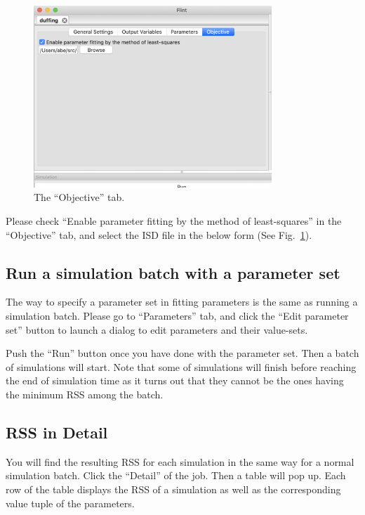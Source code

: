 \documentclass[a4paper,10pt]{report}
\begin{document}
\begin{figure}[htbp]
\centering
\includegraphics[width=0.8\textwidth]{image/parameter-fitting-objective.png}
\caption{\label{fig:orga6bd78b}The ``Objective'' tab.}
\end{figure}

Please check ``Enable parameter fitting by the method of least-squares'' in the
``Objective'' tab, and select the ISD file in the below form (See
Fig.~\ref{fig:orga6bd78b}).

\subsection{Run a simulation batch with a parameter set}
\label{sec:org11c4248}
The way to specify a parameter set in fitting parameters is the same as running
a simulation batch. Please go to ``Parameters'' tab, and click the ``Edit parameter
set'' button to launch a dialog to edit parameters and their value-sets.

Push the ``Run'' button once you have done with the parameter set. Then a batch
of simulations will start. Note that some of simulations will finish before
reaching the end of simulation time as it turns out that they cannot be the ones
having the minimum RSS among the batch.

\subsection{RSS in Detail}
\label{sec:org590ab78}
You will find the resulting RSS for each simulation in the same way for a normal
simulation batch. Click the ``Detail'' of the job. Then a table will pop up.
Each row of the table displays the RSS of a simulation as well as the
corresponding value tuple of the parameters.
\end{document}
